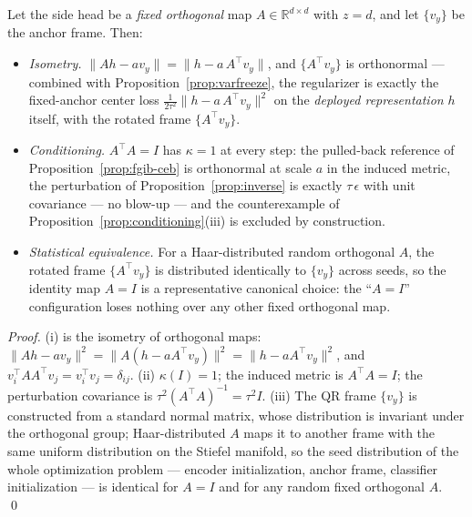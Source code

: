\begin{proposition}\label{prop:orth}
Let the side head be a \emph{fixed orthogonal} map $A \in \mathbb{R}^{d\times d}$ with
$z = d$, and let $\{v_y\}$ be the anchor frame. Then:
\begin{itemize}
\item[(i)] \emph{Isometry.} $\|A h - a v_y\| = \|h - a\,A^{\top} v_y\|$, and
$\{A^{\top}v_y\}$ is orthonormal --- combined with
Proposition~\ref{prop:varfreeze}, the regularizer is exactly the fixed-anchor center
loss $\tfrac{1}{2\tau^2}\|h - a\,A^{\top}v_y\|^2$ on the \emph{deployed representation}
$h$ itself, with the rotated frame $\{A^{\top}v_y\}$.
\item[(ii)] \emph{Conditioning.} $A^{\top}A = I$ has $\kappa = 1$ at every step: the
pulled-back reference of Proposition~\ref{prop:fgib-ceb} is orthonormal at scale $a$ in
the induced metric, the perturbation of Proposition~\ref{prop:inverse} is exactly
$\tau\,\epsilon$ with unit covariance --- no blow-up --- and the counterexample of
Proposition~\ref{prop:conditioning}(iii) is excluded by construction.
\item[(iii)] \emph{Statistical equivalence.} For a Haar-distributed random orthogonal
$A$, the rotated frame $\{A^{\top}v_y\}$ is distributed identically to $\{v_y\}$ across
seeds, so the identity map $A = I$ is a representative canonical choice: the
``$A{=}I$'' configuration loses nothing over any other fixed orthogonal map.
\end{itemize}
\end{proposition}

\begin{proof}
(i) is the isometry of orthogonal maps: $\|Ah - av_y\|^2
= \|A(h - aA^{\top}v_y)\|^2 = \|h - aA^{\top}v_y\|^2$, and
$v_i^{\top}A A^{\top} v_j = v_i^{\top}v_j = \delta_{ij}$. (ii) $\kappa(I) = 1$; the
induced metric is $A^{\top}A = I$; the perturbation covariance is
$\tau^2(A^{\top}A)^{-1} = \tau^2 I$. (iii) The QR frame $\{v_y\}$ is constructed from a
standard normal matrix, whose distribution is invariant under the orthogonal group;
Haar-distributed $A$ maps it to another frame with the same uniform distribution on the
Stiefel manifold, so the seed distribution of the whole optimization problem --- encoder
initialization, anchor frame, classifier initialization --- is identical for $A=I$ and
for any random fixed orthogonal $A$.
\hfill\qed
\end{proof}

